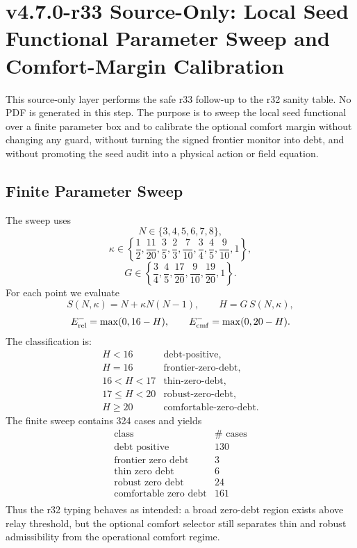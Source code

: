 \section{v4.7.0-r33 Source-Only: Local Seed Functional Parameter Sweep and Comfort-Margin Calibration}
\label{sec:v470-r33-parameter-sweep-comfort-calibration}

This source-only layer performs the safe r33 follow-up to the r32 sanity table.
No PDF is generated in this step.  The purpose is to sweep the local seed
functional over a finite parameter box and to calibrate the optional comfort
margin without changing any guard, without turning the signed frontier monitor
into debt, and without promoting the seed audit into a physical action or field
equation.

\subsection{Finite Parameter Sweep}
\label{subsec:r33-finite-parameter-sweep}

The sweep uses
\[
N\in\{3,4,5,6,7,8\},
\]
\[
\kappa\in
\left\{
\frac12,\frac{11}{20},\frac35,\frac23,\frac7{10},\frac34,\frac45,\frac9{10},1
\right\},
\]
\[
G\in
\left\{
\frac34,\frac45,\frac{17}{20},\frac9{10},\frac{19}{20},1
\right\}.
\]
For each point we evaluate
\[
S(N,\kappa)=N+\kappa N(N-1),
\qquad
H=G\,S(N,\kappa),
\]
\[
E_{\rm rel}^{-}=\max(0,16-H),
\qquad
E_{\rm cmf}^{-}=\max(0,20-H).
\]
The classification is:
\[
\begin{array}{ll}
H<16 & \text{debt-positive},\\
H=16 & \text{frontier-zero-debt},\\
16<H<17 & \text{thin-zero-debt},\\
17\leq H<20 & \text{robust-zero-debt},\\
H\geq20 & \text{comfortable-zero-debt}.
\end{array}
\]
The finite sweep contains 324 cases and yields
\[
\begin{array}{c|c}
\text{class} & \#\text{ cases}\\
\hline
\text{debt positive} & 130\\
\text{frontier zero debt} & 3\\
\text{thin zero debt} & 6\\
\text{robust zero debt} & 24\\
\text{comfortable zero debt} & 161\\
\end{array}
\]
Thus the r32 typing behaves as intended: a broad zero-debt region exists above
relay threshold, but the optional comfort selector still separates thin and
robust admissibility from the operational comfort regime.

